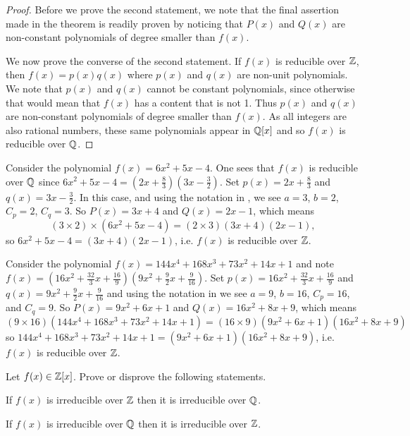 \begin{proof}
    Before we prove the second statement, we note that the final assertion made in the theorem is readily proven by noticing that $P(x)$ and $Q(x)$ are non-constant polynomials of degree smaller than $f(x)$.

    We now prove the converse of the second statement. If $f(x)$ is reducible over $\mathbb{Z}$, then $f(x) = p(x)q(x)$ where $p(x)$ and $q(x)$ are non-unit polynomials. We note that $p(x)$ and $q(x)$ cannot be constant polynomials, since otherwise that would mean that $f(x)$ has a content that is not 1. Thus $p(x)$ and $q(x)$ are non-constant polynomials of degree smaller than $f(x)$. As all integers are also rational numbers, these same polynomials appear in $\mathbb{Q}[x]$ and so $f(x)$ is reducible over $\mathbb{Q}$.
\end{proof}

\begin{example}
    Consider the polynomial $f(x) = 6x^2 + 5x - 4$. One sees that $f(x)$ is reducible over $\mathbb{Q}$ since $6x^2 + 5x - 4 = \left(2x + \frac83\right)\left(3x - \frac32\right)$. Set $p(x) = 2x + \frac83$ and $q(x) = 3x - \frac32$. In this case, and using the notation in , we see $a = 3$, $b = 2$, $C_p = 2$, $C_q = 3$. So $P(x) = 3x + 4$ and $Q(x) = 2x - 1$, which means
    \[
        (3\times2)\times (6x^2 + 5x - 4) = (2\times3)(3x+4)(2x-1),
    \]
    so $6x^2 + 5x - 4 = (3x+4)(2x-1)$, i.e. $f(x)$ is reducible over $\mathbb{Z}$.
\end{example}

\begin{example}
    Consider the polynomial $f(x) = 144x^4 + 168x^3 + 73x^2 + 14x + 1$ and note $f(x) = \left(16x^2 + \frac{32}3x + \frac{16}9\right)\left(9x^2 + \frac92x + \frac9{16}\right)$. Set $p(x) = 16x^2 + \frac{32}3x + \frac{16}9$ and $q(x) = 9x^2 + \frac92x + \frac9{16}$ and using the notation in  we see $a = 9$, $b = 16$, $C_p = 16$, and $C_q = 9$. So $P(x) = 9x^2+6x+1$ and $Q(x) = 16x^2 + 8x + 9$, which means
    \[
        (9 \times 16)\left(144x^4 + 168x^3 + 73x^2 + 14x + 1\right) = (16 \times 9)(9x^2+6x+1)(16x^2 + 8x + 9)
    \]
    so $144x^4 + 168x^3 + 73x^2 + 14x + 1 = (9x^2+6x+1)(16x^2 + 8x + 9)$, i.e. $f(x)$ is reducible over $\mathbb{Z}$.
\end{example}

\begin{exercise}
    Let $f(x) \in \mathbb{Z}[x]$. Prove or disprove the following statements.
    \begin{partquestions}{\alph*}
        \item If $f(x)$ is irreducible over $\mathbb{Z}$ then it is irreducible over $\mathbb{Q}$.
        \item If $f(x)$ is irreducible over $\mathbb{Q}$ then it is irreducible over $\mathbb{Z}$.
    \end{partquestions}
\end{exercise}

